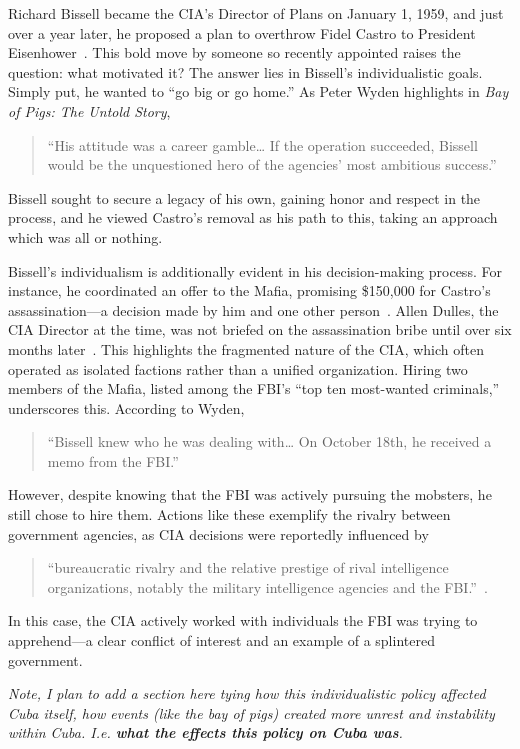 \documentclass{article}
\begin{document}
    Richard Bissell became the CIA's Director of Plans on January 1, 1959, and just over a year later, he proposed a plan to overthrow Fidel Castro to President Eisenhower~\cite{Wyden1979}. This bold move by someone so recently appointed raises the question: what motivated it? The answer lies in Bissell's individualistic goals. Simply put, he wanted to “go big or go home.” As Peter Wyden highlights in \textit{Bay of Pigs: The Untold Story}, 
    \begin{quotation}
        “His attitude was a career gamble… If the operation succeeded, Bissell would be the unquestioned hero of the agencies' most ambitious success.”
    \end{quotation} 
    Bissell sought to secure a legacy of his own, gaining honor and respect in the process, and he viewed Castro's removal as his path to this, taking an approach which was all or nothing.

    Bissell's individualism is additionally evident in his decision-making process. For instance, he coordinated an offer to the Mafia, promising \$150,000 for Castro's assassination—a decision made by him and one other person~\cite{Wyden1979}. Allen Dulles, the CIA Director at the time, was not briefed on the assassination bribe until over six months later~\cite{Wyden1979}. This highlights the fragmented nature of the CIA, which often operated as isolated factions rather than a unified organization. Hiring two members of the Mafia, listed among the FBI's “top ten most-wanted criminals,” underscores this. According to Wyden, \begin{quotation}
        “Bissell knew who he was dealing with… On October 18th, he received a memo from the FBI.”~\cite{Wyden1979}
    \end{quotation}  
    However, despite knowing that the FBI was actively pursuing the mobsters, he still chose to hire them. Actions like these exemplify the rivalry between government agencies, as CIA decisions were reportedly influenced by 
    \begin{quotation} 
        “bureaucratic rivalry and the relative prestige of rival intelligence organizations, notably the military intelligence agencies and the FBI.”~\cite{JeffreysJones2003}.
    \end{quotation} 
    In this case, the CIA actively worked with individuals the FBI was trying to apprehend—a clear conflict of interest and an example of a splintered government.

    \textit{Note, I plan to add a section here tying how this individualistic policy affected Cuba itself, how events (like the bay of pigs) created more unrest and instability within Cuba. I.e. \textbf{what the effects this policy on Cuba was}.}
\end{document}
